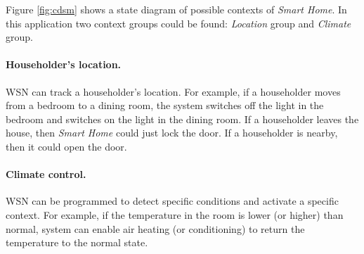 \documentclass{ubicomp-ext}
\begin{document}
Figure \ref{fig:cdsm} shows a state diagram of possible contexts of \textit{Smart Home}. In this application two context groups could be found: \textit{Location} group and \textit{Climate} group.
\paragraph{Householder's location.} WSN can track a householder's location. For example, if a householder moves from a bedroom to a dining room, the system switches off the light in the bedroom and switches on the light in the dining room. If a householder leaves the house, then \textit{Smart Home} could just lock the door. If a householder is nearby, then it could open the door.
\paragraph{Climate control.} WSN can be programmed to detect specific conditions and activate a specific context. For example, if the temperature in the room is lower (or higher) than normal, system can enable air heating (or conditioning) to return the temperature to the normal state.
\end{document}
